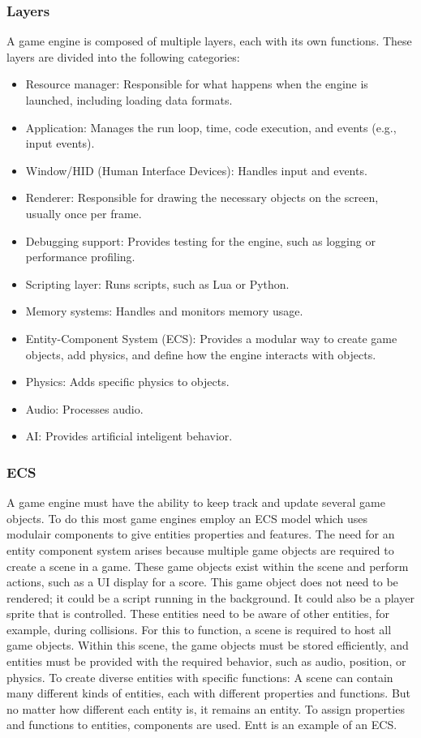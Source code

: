\documentclass{projdoc}
\begin{document}
    \subsubsection{Layers}
    A game engine is composed of multiple layers, each with its own functions. These layers are divided into the following categories:
    \begin{itemize}
        \item Resource manager: Responsible for what happens when the engine is launched, including loading data formats.
        \item Application: Manages the run loop, time, code execution, and events (e.g., input events).
        \item Window/HID (Human Interface Devices): Handles input and events.
        \item Renderer: Responsible for drawing the necessary objects on the screen, usually once per frame.
        \item Debugging support: Provides testing for the engine, such as logging or performance profiling.
        \item Scripting layer: Runs scripts, such as Lua or Python.
        \item Memory systems: Handles and monitors memory usage.
        \item Entity-Component System (ECS): Provides a modular way to create game objects, add physics, and define how the engine interacts with objects.
        \item Physics: Adds specific physics to objects.
        \item Audio: Processes audio.
        \item AI: Provides artificial inteligent behavior.
    \end{itemize}
    
    \subsubsection{ECS}
        A game engine must have the ability to keep track and update several game objects. To do this most game engines employ an ECS model which uses modulair components to give entities properties and features.
        The need for an entity component system arises because multiple game objects are required to create a scene in a game. These game objects exist within the scene and perform actions, such as a UI display for a score.
        This game object does not need to be rendered; it could be a script running in the background.
        It could also be a player sprite that is controlled.
        These entities need to be aware of other entities, for example, during collisions.
        For this to function, a scene is required to host all game objects.
        Within this scene, the game objects must be stored efficiently, and entities must be provided with the required behavior, such as audio, position, or physics.
        To create diverse entities with specific functions:
        A scene can contain many different kinds of entities, each with different properties and functions.
        But no matter how different each entity is, it remains an entity.
        To assign properties and functions to entities, components are used.
        Entt is an example of an ECS.
\end{document}
